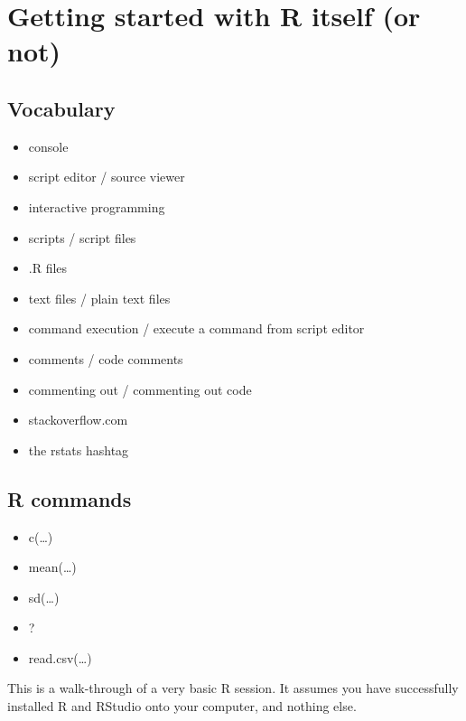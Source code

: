 \documentclass[
]{book}
\providecommand{\tightlist}{%
  \setlength{\itemsep}{0pt}\setlength{\parskip}{0pt}}
\begin{document}
\hypertarget{getting-started-with-r-itself-or-not}{%
\chapter*{Getting started with R itself (or not)}\label{getting-started-with-r-itself-or-not}}

\hypertarget{vocabulary-2}{%
\section*{Vocabulary}\label{vocabulary-2}}

\begin{itemize}
\tightlist
\item
  console
\item
  script editor / source viewer
\item
  interactive programming
\item
  scripts / script files
\item
  .R files
\item
  text files / plain text files
\item
  command execution / execute a command from script editor
\item
  comments / code comments
\item
  commenting out / commenting out code
\item
  stackoverflow.com
\item
  the rstats hashtag
\end{itemize}

\hypertarget{r-commands}{%
\section*{R commands}\label{r-commands}}

\begin{itemize}
\tightlist
\item
  c(\ldots)
\item
  mean(\ldots)
\item
  sd(\ldots)
\item
  ?
\item
  read.csv(\ldots)
\end{itemize}

This is a walk-through of a very basic R session. It assumes you have successfully installed R and RStudio onto your computer, and nothing else.
\end{document}
